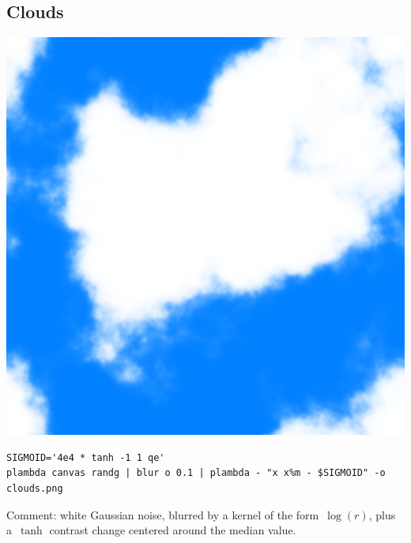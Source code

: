 \subsection{Clouds}
\includegraphics{clouds.png}
\begin{verbatim}
SIGMOID='4e4 * tanh -1 1 qe'
plambda canvas randg | blur o 0.1 | plambda - "x x%m - $SIGMOID" -o clouds.png
\end{verbatim}
Comment: white Gaussian noise, blurred by a kernel of the form~$\log(r)$,
plus a~$\tanh$ contrast change centered around the median value.

